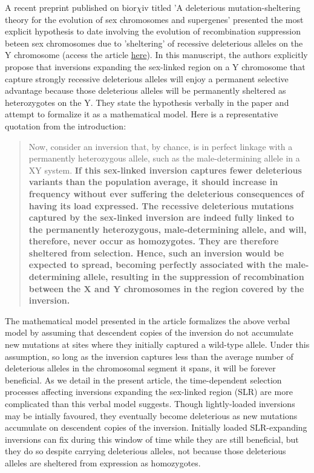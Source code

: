 \documentclass{article}
\begin{document}
\begin{appendices}
A recent preprint published on bior$\chi$iv titled 'A deleterious mutation-sheltering theory for the evolution of sex chromosomes and supergenes' presented the most explicit hypothesis to date involving the evolution of recombination suppression beteen sex chromosomes due to 'sheltering' of recessive deleterious alleles on the Y chromosome (access the article \href{https://www.biorxiv.org/content/10.1101/2021.05.17.444504v1.article-info}{\color{blue} here}). In this manuscript, the authors explicitly propose that inversions expanding the sex-linked region on a Y chromosome that capture strongly recessive deleterious alleles will enjoy a permanent selective advantage because those deleterious alleles will be permanently sheltered as heterozygotes on the Y. They state the hypothesis verbally in the paper and attempt to formalize it as a mathematical model. Here is a representative quotation from the introduction:

	\begin{quote}
		Now, consider an inversion that, by chance, is in perfect linkage with a permanently heterozygous allele, such as the male-determining allele in a XY system. \bf{If this sex-linked inversion captures fewer deleterious variants than the population average, it should increase in frequency without ever suffering the deleterious consequences of having its load expressed. The recessive deleterious mutations captured by the sex-linked inversion are indeed fully linked to the permanently heterozygous, male-determining allele, and will, therefore, never occur as homozygotes. They are therefore sheltered from selection}. Hence, such an inversion would be expected to spread, becoming perfectly associated with the male-determining allele, resulting in the suppression of recombination between the X and Y chromosomes in the region covered by the inversion.
	\end{quote}

\noindent The mathematical model presented in the article formalizes the above verbal model by assuming that descendent copies of the inversion do not accumulate new mutations at sites where they initially captured a wild-type allele. Under this assumption, so long as the inversion captures less than the average number of deleterious alleles in the chromosomal segment it spans, it will be forever beneficial. As we detail in the present article, the time-dependent selection processes affecting inversions expanding the sex-linked region (SLR) are more complicated than this verbal model suggests. Though lightly-loaded inversions may be intially favoured, they eventually become deleterious as new mutations accumulate on descendent copies of the inversion. Initially loaded SLR-expanding inversions can fix during this window of time while they are still beneficial, but they do so despite carrying deleterious alleles, not because those deleterious alleles are sheltered from expression as homozygotes.




\end{appendices}
\end{document}

